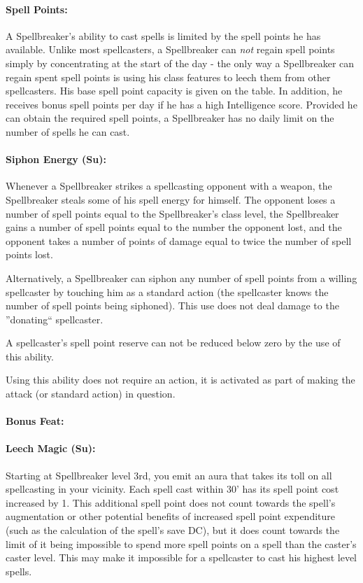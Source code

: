 \paragraph{Spell Points:} A Spellbreaker's ability to cast spells is limited by the spell points he has available. 
Unlike most spellcasters, a Spellbreaker can \emph{not} regain spell points simply by concentrating at the start of the day - the only way a Spellbreaker can regain spent spell points is using his class features to leech them from other spellcasters.
His base spell point capacity is given on the  table. In addition, he receives bonus spell points per day if he has a high Intelligence score.
Provided he can obtain the required spell points, a Spellbreaker has no daily limit on the number of spells he can cast.

\paragraph{Siphon Energy (Su):} Whenever a Spellbreaker strikes a spellcasting opponent with a weapon, the Spellbreaker steals some of his spell energy for himself. The opponent loses a number of spell points equal to the Spellbreaker's class level, the Spellbreaker gains a number of spell points equal to the number the opponent lost, and the opponent takes a number of points of damage equal to twice the number of spell points lost.

Alternatively, a Spellbreaker can siphon any number of spell points from a willing spellcaster by touching him as a standard action (the spellcaster knows the number of spell points being siphoned). This use does not deal damage to the ''donating`` spellcaster.

A spellcaster's spell point reserve can not be reduced below zero by the use of this ability.

Using this ability does not require an action, it is activated as part of making the attack (or standard action) in question.
\paragraph{Bonus Feat:} 
\paragraph{Leech Magic (Su):} Starting at Spellbreaker level 3rd, you emit an aura that takes its toll on all spellcasting in your vicinity. Each spell cast within 30' has its spell point cost increased by 1. This additional spell point does not count towards the spell's augmentation or other potential benefits of increased spell point expenditure (such as the calculation of the spell's save DC), but it does count towards the limit of it being impossible to spend more spell points on a spell than the caster's caster level. This may make it impossible for a spellcaster to cast his highest level spells.

